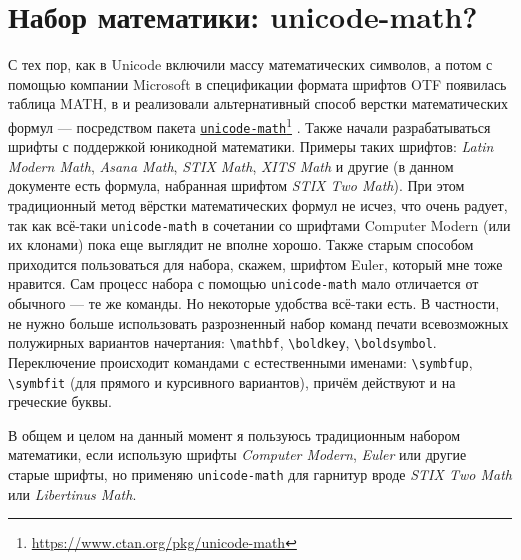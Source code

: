 \documentclass[a4paper,12pt]{article}
\let\orighref=\href
\renewcommand\href[2]{%
  \orighref{#1}{#2}\footnote{\url{#1}}%
}
\begin{document}
\section{Набор математики: unicode-math?}
С тех пор, как в Unicode включили массу математических символов, а потом с
помощью компании Microsoft в спецификации формата шрифтов OTF
появилась таблица MATH, в \LuaLaTeX и \XeTeX реализовали альтернативный
способ верстки математических формул --- посредством пакета
\href{https://www.ctan.org/pkg/unicode-math}{\texttt{unicode-math}}%
.
Также начали разрабатываться шрифты с поддержкой юникодной математики. Примеры таких
шрифтов: \emph{Latin Modern Math}, \emph{Asana Math}, \emph{STIX Math},
\emph{XITS Math} и другие (в данном документе есть формула, набранная
шрифтом \emph{STIX Two Math}).
При этом традиционный метод вёрстки математических формул не исчез, что
очень радует, так как всё-таки \texttt{unicode-math} в сочетании со шрифтами
Computer Modern (или их клонами) пока еще выглядит не вполне хорошо.
Также старым способом приходится пользоваться для набора, скажем, шрифтом
Euler, который мне тоже нравится. Сам процесс набора с помощью \texttt{unicode-math}
мало отличается от обычного --- те же команды. Но некоторые удобства всё-таки
есть. В частности, не нужно больше использовать разрозненный набор команд
печати всевозможных полужирных вариантов начертания: \verb|\mathbf|, \verb|\boldkey|,
\verb|\boldsymbol|. Переключение происходит командами с естественными именами:
\verb|\symbfup|, \verb|\symbfit| (для прямого и курсивного вариантов), причём
действуют и на греческие буквы.

В общем и целом на данный момент я пользуюсь традиционным набором математики,
если использую шрифты \emph{Computer Modern}, \emph{Euler} или другие старые шрифты, но
применяю \texttt{unicode-math} для гарнитур вроде \emph{STIX Two Math} или
\emph{Libertinus Math}.
\end{document}
